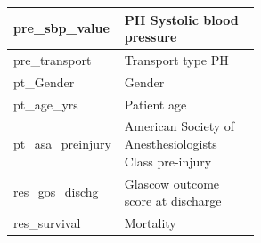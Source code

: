 \documentclass[12pt, letterpaper]{article}
\begin{document}
\begin{appendices}
\begin{longtable}[c]{@{}|l|p{0.55\linewidth}|@{}}
        pre\_sbp\_value                             & PH Systolic blood pressure                                        \\\hline
        pre\_transport                              & Transport type PH                                                 \\\hline
        pt\_Gender                                  & Gender                                                            \\\hline
        pt\_age\_yrs                                & Patient age                                                       \\\hline
        pt\_asa\_preinjury                          & American Society of Anesthesiologists Class pre-injury            \\\hline
        res\_gos\_dischg                            & Glascow outcome score at discharge                                \\\hline
        res\_survival                               & Mortality                                                         \\\hline
    \end{longtable}
\end{appendices}
\end{document}
